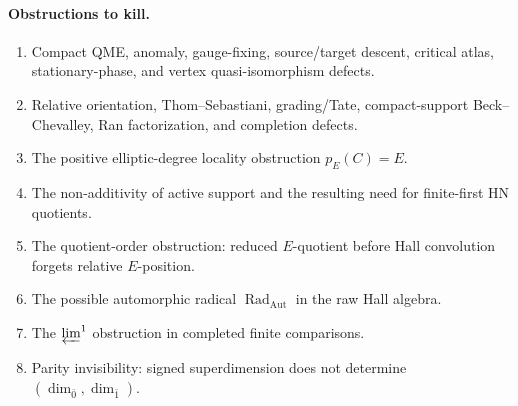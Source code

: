 \paragraph{Obstructions to kill.}
\begin{enumerate}
\item Compact QME, anomaly, gauge-fixing, source/target descent, critical
atlas, stationary-phase, and vertex quasi-isomorphism defects.
\item Relative orientation, Thom--Sebastiani, grading/Tate, compact-support
Beck--Chevalley, Ran factorization, and completion defects.
\item The positive elliptic-degree locality obstruction \(p_E(C)=E\).
\item The non-additivity of active support and the resulting need for
finite-first HN quotients.
\item The quotient-order obstruction: reduced \(E\)-quotient before Hall
convolution forgets relative \(E\)-position.
\item The possible automorphic radical
\(\operatorname{Rad}_{\operatorname{Aut}}\) in the raw Hall algebra.
\item The \(\varprojlim^1\) obstruction in completed finite comparisons.
\item Parity invisibility: signed superdimension does not determine
\((\dim_{\bar0},\dim_{\bar1})\).
\end{enumerate}

